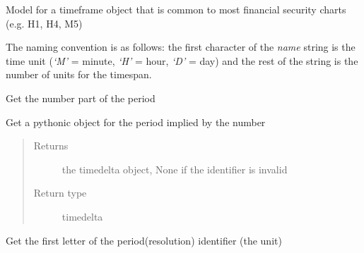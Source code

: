 \documentclass[letterpaper,10pt,english]{sphinxmanual}
\begin{document}

\begin{fulllineitems}
\label{index:model.models.Period}
Model for a timeframe object that is common to most financial security charts (e.g. H1, H4, M5)

The naming convention is as follows: the first character of the \emph{name} string is the time unit
(\emph{`M'} = minute, \emph{`H'} = hour, \emph{`D'} = day) and the rest of the string is the number of units for
the timespan.

\begin{fulllineitems}
\label{index:model.models.Period.get_numeric}
Get the number part of the period

\end{fulllineitems}


\begin{fulllineitems}
\label{index:model.models.Period.get_py_tdelta}
Get a pythonic  object for the period implied by the number
\begin{quote}\begin{description}
\item[{Returns}] \leavevmode
the timedelta object, None if the identifier is invalid

\item[{Return type}] \leavevmode
timedelta

\end{description}\end{quote}

\end{fulllineitems}


\begin{fulllineitems}
\label{index:model.models.Period.get_unit_letter}
Get the first letter of the period(resolution) identifier (the unit)

\end{fulllineitems}


\end{fulllineitems}
\end{document}
